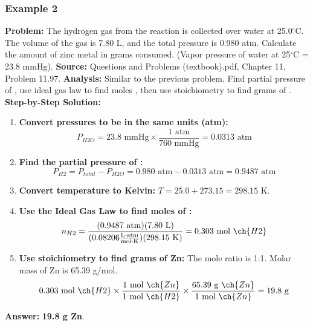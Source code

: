 \documentclass{article}
\begin{document}
\subsubsection{Example 2}
\textbf{Problem:} The hydrogen gas from the reaction  is collected over water at 25.0$^\circ$C. The volume of the gas is 7.80 L, and the total pressure is 0.980 atm. Calculate the amount of zinc metal in grams consumed. (Vapor pressure of water at 25$^\circ$C = 23.8 mmHg).
\textbf{Source:} Questions and Problems (textbook).pdf, Chapter 11, Problem 11.97.
\textbf{Analysis:} Similar to the previous problem. Find partial pressure of , use ideal gas law to find moles , then use stoichiometry to find grams of .
\textbf{Step-by-Step Solution:}
\begin{enumerate}
    \item \textbf{Convert pressures to be in the same units (atm):}
    \[ P_{H2O} = 23.8 \text{ mmHg} \times \frac{1 \text{ atm}}{760 \text{ mmHg}} = 0.0313 \text{ atm} \]
    \item \textbf{Find the partial pressure of :}
    \[ P_{H2} = P_{total} - P_{H2O} = 0.980 \text{ atm} - 0.0313 \text{ atm} = 0.9487 \text{ atm} \]
    \item \textbf{Convert temperature to Kelvin:} $T = 25.0 + 273.15 = 298.15$ K.
    \item \textbf{Use the Ideal Gas Law to find moles of :}
    \[ n_{H2} = \frac{(0.9487 \text{ atm})(7.80 \text{ L})}{(0.08206 \frac{\text{L}\cdot\text{atm}}{\text{mol}\cdot\text{K}})(298.15 \text{ K})} = 0.303 \text{ mol } \ch{H2} \]
    \item \textbf{Use stoichiometry to find grams of Zn:} The mole ratio is 1:1. Molar mass of Zn is 65.39 g/mol.
    \[ 0.303 \text{ mol } \ch{H2} \times \frac{1 \text{ mol } \ch{Zn}}{1 \text{ mol } \ch{H2}} \times \frac{65.39 \text{ g } \ch{Zn}}{1 \text{ mol } \ch{Zn}} = 19.8 \text{ g} \]
\end{enumerate}
\textbf{Answer:} \textbf{19.8 g Zn}.
\end{document}
